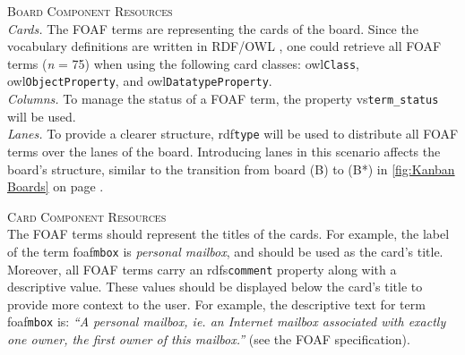\vspace*{\baselineskip}

\noindent \textsc{Board Component Resources}\label{par:FOAF-BCR}\\[-1.5em]

\noindent \hangindent=1.7cm \textit{Cards.}\tabto{1.7cm} The \acrshort*{FOAF} terms are representing the cards of the board. Since the vocabulary definitions are written in \acrshort*{RDF}/\acrshort*{OWL} \parencite{Miller2014}, one could retrieve all \acrshort*{FOAF} terms (\textit{n} = 75) when using the following card classes: \acrshort{owl}\texttt{Class}, \acrshort{owl}\texttt{ObjectProperty}, and \acrshort{owl}\texttt{DatatypeProperty}.\\[-1.5em]


\noindent \hangindent=1.7cm \textit{Columns.}\tabto{1.7cm} To manage the status of a \acrshort*{FOAF} term, the property \acrshort{vs}\texttt{term\_status} will be used.\\[-1.5em]


\noindent \hangindent=1.7cm \textit{Lanes.}\tabto{1.7cm} To provide a clearer structure, \acrshort{rdf}\texttt{type} will be used to distribute all \acrshort*{FOAF} terms over the lanes of the board. Introducing lanes in this scenario affects the board’s structure, similar to the transition from board (B) to (B*) in \autoref{fig:Kanban Boards} on page \pageref{fig:Kanban Boards}.


\vspace*{\baselineskip}

\noindent \textsc{Card Component Resources}\\
\noindent The \acrshort*{FOAF} terms should represent the titles of the cards. For example, the label of the term \acrshort{foaf}\texttt{mbox} is \textit{personal mailbox}, and should be used as the card’s title. Moreover, all \acrshort*{FOAF} terms carry an \acrshort{rdfs}\texttt{comment} property along with a descriptive value. These values should be displayed below the card’s title to provide more context to the user. For example, the descriptive text for term \acrshort{foaf}\texttt{mbox} is: \textit{“A personal mailbox, ie. an Internet mailbox associated with exactly one owner, the first owner of this mailbox.”} (see the \acrshort*{FOAF} specification).


\vspace*{\baselineskip}

